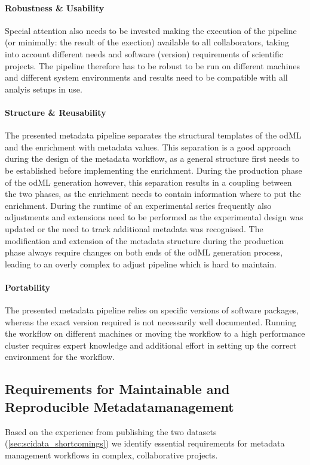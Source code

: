 \paragraph{Robustness \& Usability}
Special attention also needs to be invested making the execution of the pipeline (or minimally: the result of the exection) available to all collaborators, taking into account different needs and software (version) requirements of scientific projects. The pipeline therefore has to be robust to be run on different machines and different system environments and results need to be compatible with all analyis setups in use.

\paragraph{Structure \& Reusability} The presented metadata pipeline separates the structural templates of the odML and the enrichment with metadata values. This separation is a good approach during the design of the metadata workflow, as a general structure first needs to be established before implementing the enrichment. During the production phase of the odML generation however, this separation results in a coupling between the two phases, as the enrichment needs to contain information where to put the enrichment. During the runtime of an experimental series frequently also adjustments and extensions need to be performed as the experimental design was updated or the need to track additional metadata was recognised. The modification and extension of the metadata structure during the production phase always require changes on both ends of the odML generation process, leading to an overly complex to adjust pipeline which is hard to maintain.

\paragraph{Portability} The presented metadata pipeline relies on specific versions of software packages, whereas the exact version required is not necessarily well documented. Running the workflow on different machines or moving the workflow to a high performance cluster requires expert knowledge and additional effort in setting up the correct environment for the workflow.



\subsection{Requirements for Maintainable and Reproducible Metadatamanagement}
Based on the experience from publishing the two datasets (\ref{sec:scidata_shortcomings}) we identify essential requirements for metadata management workflows in complex, collaborative projects.

